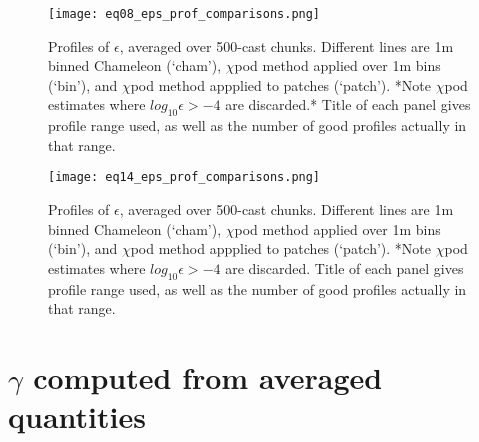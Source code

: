 \documentclass[11pt]{article}
\begin{document}
%
%
%


\begin{figure}[htbp]
\texttt{[image: eq08\_eps\_prof\_comparisons.png]}
\caption{Profiles of $\epsilon$, averaged over 500-cast chunks. Different lines are 1m binned Chameleon (`cham'), $\chi$pod method applied over 1m bins (`bin'), and $\chi$pod method appplied to patches (`patch'). *Note $\chi$pod estimates where $log_{10}\epsilon>-4$ are discarded.* Title of each panel gives profile range used, as well as the number of good profiles actually in that range.}
\label{eps_prof_comp_eq08}
\end{figure}

\begin{figure}[htbp]
\texttt{[image: eq14\_eps\_prof\_comparisons.png]}
\caption{Profiles of $\epsilon$, averaged over 500-cast chunks. Different lines are 1m binned Chameleon (`cham'), $\chi$pod method applied over 1m bins (`bin'), and $\chi$pod method appplied to patches (`patch'). *Note $\chi$pod estimates where $log_{10}\epsilon>-4$ are discarded. Title of each panel gives profile range used, as well as the number of good profiles actually in that range.}
\label{eps_prof_comp_eq14}
\end{figure}


\clearpage
\section{$\gamma$ computed from averaged quantities}
\end{document}
